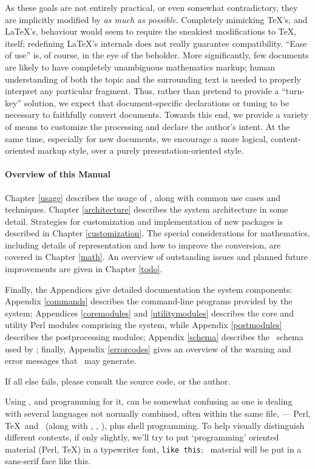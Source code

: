 \documentclass{book}
\begin{document}
As these goals are not entirely practical, or even somewhat contradictory,
they are implicitly modified by \emph{as much as possible}.
Completely mimicking \TeX's, and \LaTeX's, behaviour would seem to require the
sneakiest modifications to \TeX, itself; redefining \LaTeX's internals does 
not really guarantee compatibility. ``Ease of use'' is, of course, in the eye of the beholder.
More significantly, few documents are likely to have completely unambiguous
mathematics markup; human understanding of both the topic and the surrounding 
text is needed to properly interpret any particular fragment.
Thus, rather than pretend to provide a ``turn-key'' solution,
we expect that document-specific declarations or tuning to be necessary
to faithfully convert documents.  Towards this end, we provide a variety
of means to customize the processing and declare the author's intent.
At the same time, especially for new documents, we encourage a more logical, 
content-oriented markup style, over a purely presentation-oriented style.

\paragraph[Overview]{Overview of this Manual}
Chapter \ref{usage} describes the usage of \LaTeXML, along with
common use cases and techniques.  Chapter \ref{architecture} describes
the system architecture in some detail. Strategies for customization
and implementation of new packages is described in Chapter \ref{customization}.
The special considerations for mathematics, including details of representation
and how to improve the conversion, are covered in Chapter \ref{math}.
An overview of outstanding issues and planned future improvements
are given in Chapter \ref{todo}.

Finally, the Appendices give detailed documentation the system components:
Appendix \ref{commands} describes the command-line programs provided by the system;
Appendices \ref{coremodules} and \ref{utilitymodules} describes the core and utility Perl modules 
comprising the system, while Appendix \ref{postmodules} describes the postprocessing modules;
Appendix \ref{schema} describes the \XML\ schema used by \LaTeXML;
finally, Appendix \ref{errorcodes} gives an overview of the warning and
error messages that \LaTeXML\ may generate.

If all else fails, please consult the source code, or the author.

\vskip 1cm\relax
Using \LaTeXML, and programming for it, can be somewhat confusing as one is dealing with several
languages not normally combined, often within the same file,
--- Perl, \TeX\ and \XML\ (along with \XSLT, \HTML, \CSS), plus shell programming.
To help visually distinguish different contexts, if only slightly,
we'll try to put `programming' oriented material (Perl, \TeX) in a typewriter font,
\texttt{like this}; \XML\ material will be put in a sans-serif face
\textsf{like this}.
\end{document}
